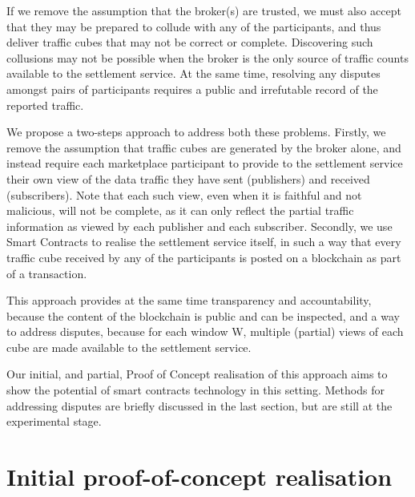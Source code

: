 \documentclass[conference]{IEEEtran}
\begin{document}
If we remove the assumption that the broker(s) are trusted, we must also accept that they may be prepared to collude with any of the participants, and thus deliver traffic cubes that may not be correct or complete.
Discovering such collusions may not be possible when the broker is the only source of traffic counts available to the settlement service.  At the same time, resolving any disputes amongst pairs of participants requires a public and irrefutable record of the reported traffic.

We propose a two-steps approach to address both these problems.
Firstly, we remove the assumption that traffic cubes are generated by the broker alone, and instead require each marketplace participant to provide to the settlement service their own view of the data traffic they have sent (publishers) and received (subscribers).
Note that each such view, even when it is faithful and not malicious, will not be complete, as it can only reflect the partial traffic information as viewed by each publisher and each subscriber.
Secondly, we use Smart Contracts to realise the settlement service itself, in such a way that every traffic cube received by any of the participants is posted on a blockchain as part of a transaction.

This  approach provides at the same time transparency and accountability, because the content of the blockchain is public and can be inspected, and a way to address disputes, because for each window W, multiple (partial) views of each cube are made available to the settlement service.

Our initial, and partial, Proof of Concept realisation of this approach aims to show the potential of smart contracts technology in this setting. Methods for addressing disputes are briefly discussed in the last section, but are still at the experimental stage.




\section{Initial proof-of-concept realisation}

\end{document}

